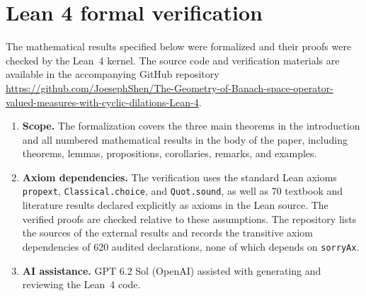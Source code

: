 \documentclass[11pt,leqno]{amsart}
\theoremstyle{compact}
\numberwithin{equation}{section}
\theoremstyle{compactremark}
\theoremstyle{compact}
\newcommand{\1}{\mathbbm{1}}
\begin{document}
\section*{Lean 4 formal verification}

The mathematical results specified below were formalized and their proofs were checked by the Lean~4 kernel. The source code and verification materials are available in the accompanying GitHub repository \href{https://github.com/JoesephShen/The-Geometry-of-Banach-space-operator-valued-measures-with-cyclic-dilations-Lean-4}{ https://github.com/JoesephShen/The-Geometry-of-Banach-space-operator-valued-measures-with-cyclic-dilations-Lean-4}.

\begin{enumerate}[itemsep=6pt,before={\emergencystretch=2em}]
\item \textbf{Scope.} The formalization covers the three main theorems in the introduction and all numbered mathematical results in the body of the paper, including theorems, lemmas, propositions, corollaries, remarks, and examples.

\item \textbf{Axiom dependencies.} The verification uses the standard Lean axioms \texttt{propext}, \texttt{Classical.choice}, and \texttt{Quot.sound}, as well as 70 textbook and literature results declared explicitly as axioms in the Lean source. The verified proofs are checked relative to these assumptions. The repository lists the sources of the external results and records the transitive axiom dependencies of 620 audited declarations, none of which depends on \texttt{sorryAx}.

\item \textbf{AI assistance.} GPT 6.2 Sol (OpenAI) assisted with generating and reviewing the Lean~4 code.
\end{enumerate}



\end{document}
